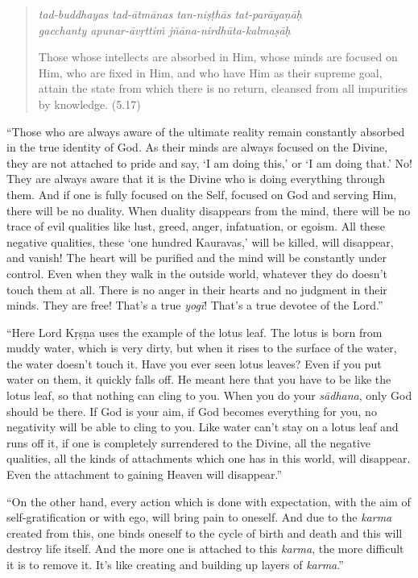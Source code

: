 \documentclass[12pt, twoside, openright]{memoir}
\begin{document}
\par
\begin{verse}
\textit{tad-buddhayas tad-ātmānas tan-niṣṭhās tat-parāyaṇāḥ} \\
\textit{gacchanty apunar-āvṛttiṁ jñāna-nirdhūta-kalmaṣāḥ}

\noindent Those whose intellects are absorbed in Him, whose minds are focused on Him, who are fixed in Him, and who have Him as their supreme goal, attain the state from which there is no return, cleansed from all impurities by knowledge. (5.17)
\end{verse}
\par




\enquote{Those who are always aware of the ultimate reality remain constantly absorbed in the true identity of God. As their minds are always focused on the Divine, they are not attached to pride and say, \enquote{I am doing this,} or \enquote{I am doing that.} No! They are always aware that it is the Divine who is doing everything through them. And if one is fully focused on the Self, focused on God and serving Him, there will be no duality. When duality disappears from the mind, there will be no trace of evil qualities like lust, greed, anger, infatuation, or egoism. All these negative qualities, these \enquote{one hundred Kauravas,} will be killed, will disappear, and vanish! The heart will be purified and the mind will be constantly under control. Even when they walk in the outside world, whatever they do doesn’t touch them at all. There is no anger in their hearts and no judgment in their minds. They are free! That’s a true \textit{yogī}! That’s a true devotee of the Lord.}

\enquote{Here Lord Kṛṣṇa uses the example of the lotus leaf. The lotus is born from muddy water, which is very dirty, but when it rises to the surface of the water, the water doesn’t touch it. Have you ever seen lotus leaves? Even if you put water on them, it quickly falls off. He meant here that you have to be like the lotus leaf, so that nothing can cling to you. When you do your \textit{sādhana}, only God should be there. If God is your aim, if God becomes everything for you, no negativity will be able to cling to you. Like water can’t stay on a lotus leaf and runs off it, if one is completely surrendered to the Divine, all the negative qualities, all the kinds of attachments which one has in this world, will disappear. Even the attachment to gaining Heaven will disappear.}

\enquote{On the other hand, every action which is done with expectation, with the aim of self-gratification or with ego, will bring pain to oneself. And due to the \textit{karma} created from this, one binds oneself to the cycle of birth and death and this will destroy life itself. And the more one is attached to this \textit{karma}, the more difficult it is to remove it. It’s like creating and building up layers of \textit{karma}.}
\end{document}

